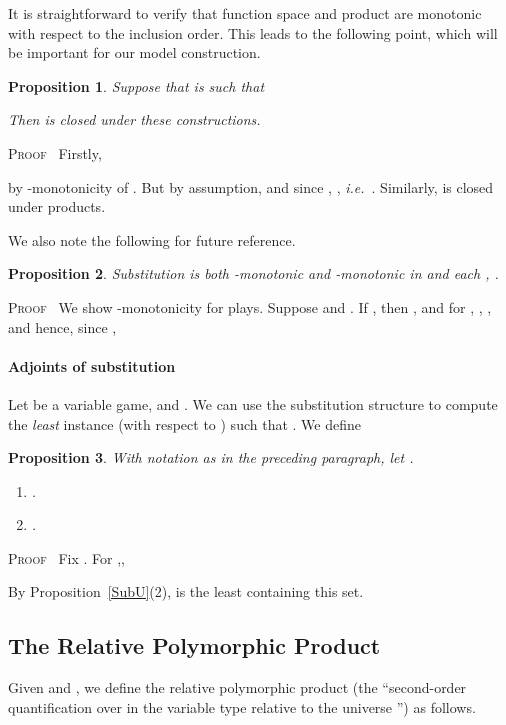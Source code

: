 \documentclass[a4paper,11pt]{article}
\newtheorem{proposition}{Proposition}[section]
\newcommand{\ie}{\textit{i.e.}\ }
\newenvironment{proof}{\textsc{Proof}\ }{}
\begin{document}
\noindent It is straightforward to verify that function space and product are
monotonic with respect to the inclusion order. This leads to the
following point, which will be important for our model construction.
\begin{proposition}
\label{Uclos}
Suppose that  is such that

Then  is closed under these constructions.
\end{proposition}
\begin{proof} Firstly,

by -monotonicity of . But  by assumption, and since , , \ie .
Similarly,  is closed under products.
\end{proof}

We also note the following for future reference.
\begin{proposition}
\label{submon}
Substitution  is both -monotonic and -monotonic in  and each , .
\end{proposition}
\begin{proof}
We show -monotonicity for plays. Suppose  and . If , then , and for , , , and hence, since ,

\end{proof}

\paragraph{Adjoints of substitution}
Let  be a variable game, and .  We can use the
substitution structure to compute the \emph{least} instance  (with
respect to )  such
that . We define


\begin{proposition}
\label{inv}
With notation as in the preceding paragraph, let .
\begin{enumerate}
\item .
\item .
\end{enumerate}
\end{proposition}
\begin{proof}
Fix . For ,,

By Proposition~\ref{SubU}(2),  is the least  containing this set.
\end{proof}

\subsection{The Relative Polymorphic Product}
Given  and , we define the relative
polymorphic product  (the ``second-order quantification over  in the
variable type  relative to the universe '') as follows.
\end{document}
